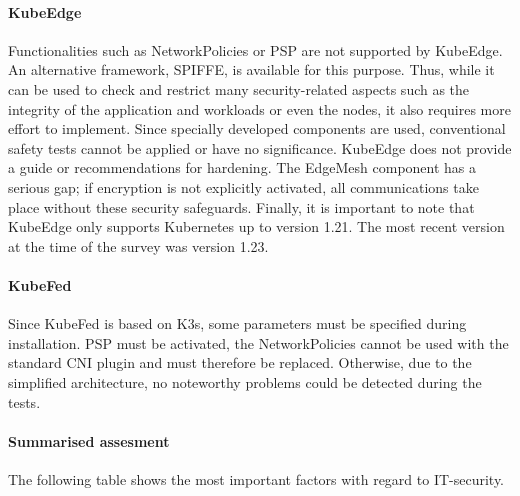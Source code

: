 \documentclass[MSC,Master,english]{twbook}%
\begin{document}
\paragraph{KubeEdge} Functionalities such as NetworkPolicies or \ac{PSP} are not supported by KubeEdge. An alternative framework, SPIFFE\cite{ke-secure-fw}, is available for this purpose. Thus, while it can be used to check and restrict many security-related aspects such as the integrity of the application and workloads or even the nodes, it also requires more effort to implement. Since specially developed components are used, conventional safety tests cannot be applied or have no significance. KubeEdge does not provide a guide or recommendations for hardening. The EdgeMesh component has a serious gap; if encryption is not explicitly activated, all communications take place without these security safeguards. Finally, it is important to note that KubeEdge only supports Kubernetes up to version 1.21. The most recent version at the time of the survey was version 1.23.

\paragraph{KubeFed} Since KubeFed is based on K3s, some parameters must be specified during installation. \ac{PSP} must be activated, the NetworkPolicies cannot be used with the standard \ac{CNI} plugin and must therefore be replaced. Otherwise, due to the simplified architecture, no noteworthy problems could be detected during the tests.

\paragraph{Summarised assesment} The following table shows the most important factors with regard to IT-security.
\end{document}
